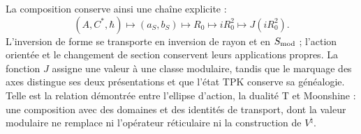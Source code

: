 La composition conserve ainsi une chaîne explicite :
\[
 (A,C^*,\hbar)\longmapsto(a_S,b_S)
 \longmapsto R_0\longmapsto iR_0^2\longmapsto J(iR_0^2).
\]
L’inversion de forme se transporte en inversion de rayon et en
\(S_{\rm mod}\) ; l’action orientée et le changement de section conservent
leurs applications propres. La fonction \(J\) assigne une valeur à une classe modulaire, tandis que
le marquage des axes distingue ses deux présentations et que l’état TPK
conserve sa généalogie. Telle est la relation démontrée entre l’ellipse
d’action, la dualité T et Moonshine : une composition avec des domaines et des
identités de transport, dont la valeur modulaire ne remplace ni l’opérateur
réticulaire ni la construction de \(V^\natural\).
